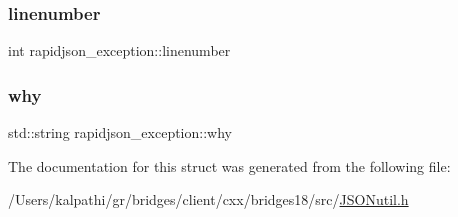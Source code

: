\mbox{\label{structrapidjson__exception_a9c0263f853d8a17911e29cae66708e67}} 
\subsubsection{\texorpdfstring{linenumber}{linenumber}}
{\footnotesize\ttfamily int rapidjson\+\_\+exception\+::linenumber}

\mbox{\label{structrapidjson__exception_a6b432b89bd7052332bc923f274249e1e}} 
\subsubsection{\texorpdfstring{why}{why}}
{\footnotesize\ttfamily std\+::string rapidjson\+\_\+exception\+::why}



The documentation for this struct was generated from the following file\+:\begin{DoxyCompactItemize}
\item 
/\+Users/kalpathi/gr/bridges/client/cxx/bridges18/src/\mbox{\hyperlink{_j_s_o_nutil_8h}{J\+S\+O\+Nutil.\+h}}\end{DoxyCompactItemize}
